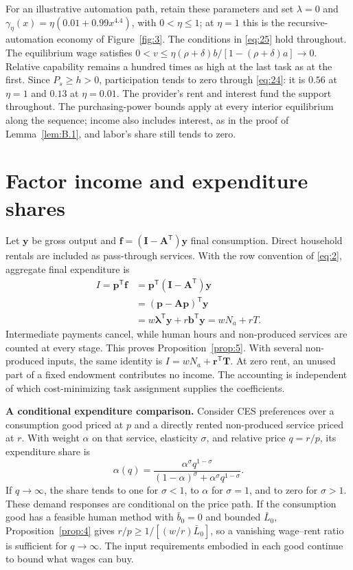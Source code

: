 \documentclass[12pt]{article}
\theoremstyle{plain}
\begin{document}
For an illustrative automation path, retain these parameters and set $\lambda=0$ and $\gamma_\eta(x)=\eta(0.01+0.99x^{4.4})$, with $0<\eta\le1$; at $\eta=1$ this is the recursive-automation economy of Figure~\ref{fig:3}. The conditions in \eqref{eq:25} hold throughout. The equilibrium wage satisfies $0<v\le\eta(\rho+\delta)b/[1-(\rho+\delta)a]\to0$. Relative capability remains a hundred times as high at the last task as at the first. Since $P_s\ge h>0$, participation tends to zero through \eqref{eq:24}: it is $0.56$ at $\eta=1$ and $0.13$ at $\eta=0.01$. The provider's rent and interest fund the support throughout. The purchasing-power bounds apply at every interior equilibrium along the sequence; income also includes interest, as in the proof of Lemma~\ref{lem:B.1}, and labor's share still tends to zero.

\section{Factor income and expenditure shares}\label{app:C}

Let $\mathbf{y}$ be gross output and $\mathbf{f}=(\mathbf{I}-\mathbf{A}^{\mathsf{T}})\mathbf{y}$ final consumption. Direct household rentals are included as pass-through services. With the row convention of \eqref{eq:2}, aggregate final expenditure is
\begin{align*}
I=\mathbf{p}^{\mathsf{T}}\mathbf{f}&=\mathbf{p}^{\mathsf{T}}(\mathbf{I}-\mathbf{A}^{\mathsf{T}})\mathbf{y}\\
&=(\mathbf{p}-\mathbf{A}\mathbf{p})^{\mathsf{T}}\mathbf{y}\\
&=w\boldsymbol{\lambda}^{\mathsf{T}}\mathbf{y}+r\mathbf{b}^{\mathsf{T}}\mathbf{y}=wN_a+rT.
\end{align*}
Intermediate payments cancel, while human hours and non-produced services are counted at every stage. This proves Proposition~\ref{prop:5}. With several non-produced inputs, the same identity is $I=wN_a+\mathbf{r}^{\mathsf{T}}\mathbf{T}$. At zero rent, an unused part of a fixed endowment contributes no income. The accounting is independent of which cost-minimizing task assignment supplies the coefficients.

\textbf{A conditional expenditure comparison.} Consider CES preferences over a consumption good priced at $p$ and a directly rented non-produced service priced at $r$. With weight $\alpha$ on that service, elasticity $\sigma$, and relative price $q=r/p$, its expenditure share is
\begin{equation}\label{eq:26}
\alpha(q)=\frac{\alpha^\sigma q^{1-\sigma}}{(1-\alpha)^\sigma+\alpha^\sigma q^{1-\sigma}}.
\end{equation}
If $q\to\infty$, the share tends to one for $\sigma<1$, to $\alpha$ for $\sigma=1$, and to zero for $\sigma>1$. These demand responses are conditional on the price path. If the consumption good has a feasible human method with $\bar{b}_0=0$ and bounded $\bar{L}_0$, Proposition~\ref{prop:4} gives $r/p\ge1/[(w/r)\bar{L}_0]$, so a vanishing wage--rent ratio is sufficient for $q\to\infty$. The input requirements embodied in each good continue to bound what wages can buy.
\end{document}
